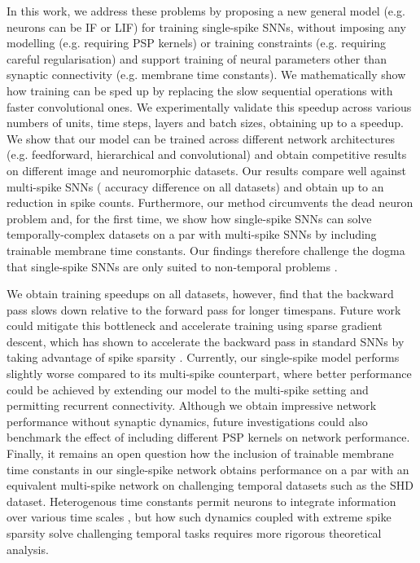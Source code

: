 \documentclass{article} \usepackage{iclr2023_conference,times}
\begin{document}
In this work, we address these problems by proposing a new general model (e.g. neurons can be IF or LIF) for training single-spike SNNs, without imposing any modelling (e.g. requiring PSP kernels) or training constraints (e.g. requiring careful regularisation) and support training of neural parameters other than synaptic connectivity (e.g. membrane time constants). We mathematically show how training can be sped up by replacing the slow sequential operations with faster convolutional ones. We experimentally validate this speedup across various numbers of units, time steps, layers and batch sizes, obtaining up to a  speedup. We show that our model can be trained across different network architectures (e.g. feedforward, hierarchical and convolutional) and obtain competitive results on different image and neuromorphic datasets. Our results compare well against multi-spike SNNs ( accuracy difference on all datasets) and obtain up to an  reduction in spike counts. Furthermore, our method circumvents the dead neuron problem and, for the first time, we show how single-spike SNNs can solve temporally-complex datasets on a par with multi-spike SNNs by including trainable membrane time constants. Our findings therefore challenge the dogma that single-spike SNNs are only suited to non-temporal problems \citep{eshraghian2021training, zenke2021visualizing}.

We obtain training speedups on all datasets, however, find that the backward pass slows down relative to the forward pass for longer timespans. Future work could mitigate this bottleneck and accelerate training using sparse gradient descent, which has shown to accelerate the backward pass in standard SNNs by taking advantage of spike sparsity \citep{perez2021sparse}. Currently, our single-spike model performs slightly worse compared to its multi-spike counterpart, where better performance could be achieved by extending our model to the multi-spike setting and permitting recurrent connectivity. Although we obtain impressive network performance without synaptic dynamics, future investigations could also benchmark the effect of including different PSP kernels on network performance. Finally, it remains an open question how the inclusion of trainable membrane time constants in our single-spike network obtains performance on a par with an equivalent multi-spike network on challenging temporal datasets such as the SHD dataset. Heterogenous time constants permit neurons to integrate information over various time scales \citep{perez2021neural}, but how such dynamics coupled with extreme spike sparsity solve challenging temporal tasks requires more rigorous theoretical analysis.
\end{document}
